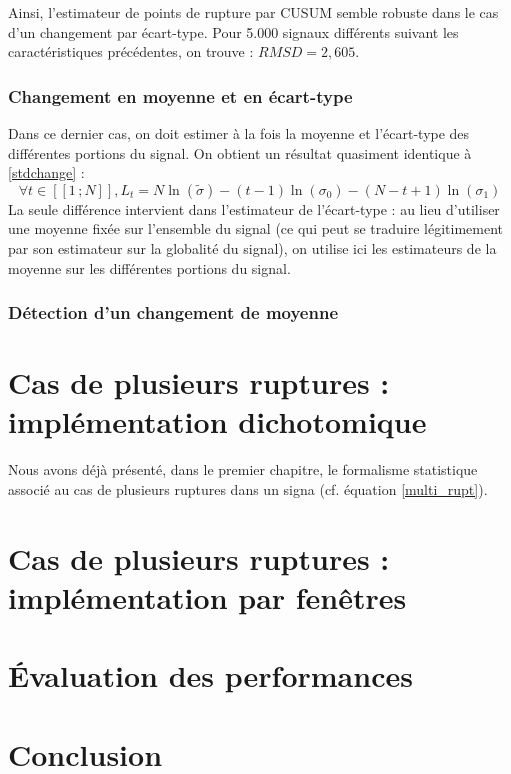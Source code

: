 \documentclass[french,11pt,notitlepage]{report}
\begin{document}
	Ainsi, l'estimateur de points de rupture par CUSUM semble robuste dans le cas d'un changement par écart-type. Pour 5.000 signaux différents suivant les caractéristiques précédentes, on trouve : $RMSD = 2,605$.
	
	
	\subsection{Changement en moyenne et en écart-type}
	
	
	Dans ce dernier cas, on doit estimer à la fois la moyenne et l'écart-type des différentes portions du signal. On obtient un résultat quasiment identique à \ref{stdchange} :
	\begin{equation}
		\forall t \in [\![1\,;N]\!], L_t = N\ln (\tilde\sigma) - (t-1) \ln (\sigma_0) - (N - t + 1) \ln (\sigma_1)
		\label{bothchange}
	\end{equation}
	La seule différence intervient dans l'estimateur de l'écart-type : au lieu d'utiliser une moyenne fixée sur l'ensemble du signal (ce qui peut se traduire légitimement par son estimateur sur la globalité du signal), on utilise ici les estimateurs  de la moyenne sur les différentes portions du signal.	
	
	\subsection{Détection d'un changement de moyenne}
	
	

	
	
	
	\chapter{Cas de plusieurs ruptures : implémentation dichotomique}



	Nous avons déjà présenté, dans le premier chapitre, le formalisme statistique associé au cas de plusieurs ruptures dans un signa (cf. équation \ref{multi_rupt}).
	
	
	
	\chapter{Cas de plusieurs ruptures : implémentation par fenêtres}
	
	
	
	
	
	
	\chapter{Évaluation des performances}
	
	
	
	
	
	
	\chapter{Conclusion}
	
	
	


	
\end{document}
